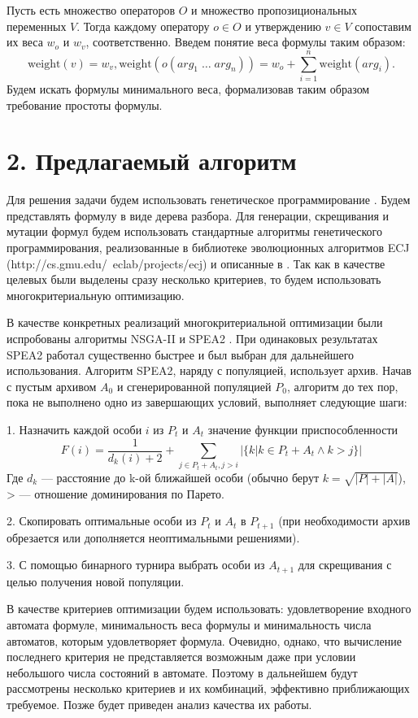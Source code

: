\documentclass[12pt,fleqn]{article}
\begin{document}
Пусть есть множество операторов $O$ и множество пропозициональных переменных $V$.
Тогда каждому оператору $o \in O$ и утверждению $v \in V$ сопоставим их веса $w_o$ и $w_v$, соответственно.
Введем понятие веса формулы таким образом:
\begin{equation*}
\text{weight}(v) = w_v, \text{weight}(o(arg_1\; \ldots \; arg_n)) = w_o + \sum_{i=1}^{n}\text{weight}(arg_i).
\end{equation*}
Будем искать формулы минимального веса, формализовав таким образом требование простоты формулы.

\section{2. Предлагаемый алгоритм}

Для решения задачи будем использовать генетическое программирование \cite{kz1}. Будем представлять формулу в виде дерева разбора.
Для генерации, скрещивания и мутации формул будем использовать стандартные алгоритмы генетического программирования,
реализованные в библиотеке эволюционных алгоритмов ECJ (http://cs.gmu.edu/~eclab/projects/ecj) и описанные в \cite{kz1, kz2}.
Так как в качестве целевых были выделены сразу несколько критериев, то будем использовать многокритериальную оптимизацию.

В качестве конкретных реализаций многокритериальной оптимизации были испробованы алгоритмы NSGA-II \cite{nsga2} и SPEA2 \cite{spea2}.
При одинаковых результатах SPEA2 работал существенно быстрее и был выбран для дальнейшего использования. Алгоритм SPEA2,
наряду с популяцией, использует архив. Начав с пустым архивом $A_0$ и сгенерированной популяцией $P_0$, алгоритм до
тех пор, пока не выполнено одно из завершающих условий, выполняет следующие шаги: 

1. Назначить каждой особи $i$ из $P_t$ и $A_t$ значение функции приспособленности
$$
F(i) = \frac{1}{d_k(i) + 2} + \sum_{j\in P_t + A_t, j > i}|\{k|k \in P_t + A_t \wedge k > j\}|
$$
Где $d_k$ --- расстояние до k-ой ближайшей особи (обычно берут $k = \sqrt{|P| + |A|}$), > --- отношение доминирования по Парето.

2. Скопировать оптимальные особи из $P_t$ и $A_t$ в $P_{t+1}$ (при необходимости архив обрезается или дополняется неоптимальными решениями).

3. С помощью бинарного турнира выбрать особи из $A_{t+1}$ для скрещивания с целью получения новой популяции. 

В качестве критериев оптимизации будем использовать: удовлетворение входного автомата формуле, минимальность веса
формулы и минимальность числа автоматов, которым удовлетворяет формула. Очевидно, однако, что вычисление последнего
критерия не представляется возможным даже при условии небольшого числа состояний в автомате. Поэтому в дальнейшем будут
рассмотрены несколько критериев и их комбинаций, эффективно приближающих требуемое. Позже будет приведен
анализ качества их работы.
\end{document}
